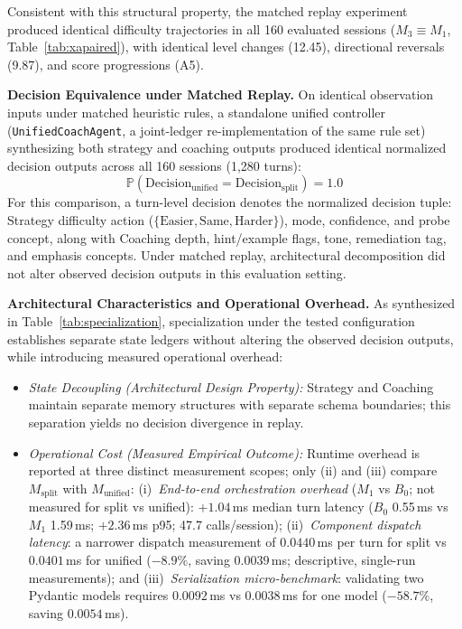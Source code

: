 Consistent with this structural property, the matched replay experiment produced identical difficulty trajectories in all 160 evaluated sessions ($M_3 \equiv M_1$, Table~\ref{tab:xapaired}), with identical level changes (12.45), directional reversals (9.87), and score progressions (A5).

\begin{table}[tbp]
\centering\scriptsize\setlength{\tabcolsep}{3pt}
\caption{Architectural and operational comparison of the Specialized Two-Agent Architecture ($M_{\text{split}}$) versus a Unified Monolithic Controller ($M_{\text{unified}}$).}\label{tab:specialization}

\end{table}

\noindent\textbf{Decision Equivalence under Matched Replay.} On identical observation inputs under matched heuristic rules, a standalone unified controller (\texttt{UnifiedCoachAgent}, a joint-ledger re-implementation of the same rule set) synthesizing both strategy and coaching outputs produced identical normalized decision outputs across all 160 sessions (1,280 turns):
$$\mathbb{P}(\text{Decision}_{\text{unified}} = \text{Decision}_{\text{split}}) = 1.0$$
For this comparison, a turn-level decision denotes the normalized decision tuple: Strategy difficulty action ($\{\text{Easier}, \text{Same}, \text{Harder}\}$), mode, confidence, and probe concept, along with Coaching depth, hint/example flags, tone, remediation tag, and emphasis concepts. Under matched replay, architectural decomposition did not alter observed decision outputs in this evaluation setting.

\noindent\textbf{Architectural Characteristics and Operational Overhead.} As synthesized in Table~\ref{tab:specialization}, specialization under the tested configuration establishes separate state ledgers without altering the observed decision outputs, while introducing measured operational overhead:
\begin{itemize}\setlength{\itemsep}{1pt}\setlength{\parskip}{0pt}
\item \emph{State Decoupling (Architectural Design Property):} Strategy and Coaching maintain separate memory structures with separate schema boundaries; this separation yields no decision divergence in replay.
\item \emph{Operational Cost (Measured Empirical Outcome):} Runtime overhead is reported at three distinct measurement scopes; only (ii) and (iii) compare $M_{\text{split}}$ with $M_{\text{unified}}$: (i)~\emph{End-to-end orchestration overhead} ($M_1$ vs $B_0$; not measured for split vs unified): $+1.04$\,ms median turn latency ($B_0$ 0.55\,ms vs $M_1$ 1.59\,ms; $+2.36$\,ms p95; 47.7 calls/session); (ii)~\emph{Component dispatch latency}: a narrower dispatch measurement of $0.0440$\,ms per turn for split vs $0.0401$\,ms for unified ($-8.9\%$, saving $0.0039$\,ms; descriptive, single-run measurements); and (iii)~\emph{Serialization micro-benchmark}: validating two Pydantic models requires $0.0092$\,ms vs $0.0038$\,ms for one model ($-58.7\%$, saving $0.0054$\,ms).\end{itemize}

